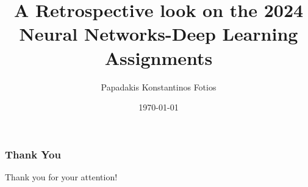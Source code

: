 \documentclass{beamer}
\title{A Retrospective look on the 2024 Neural Networks-Deep Learning Assignments}
\author{Papadakis Konstantinos Fotios}
\date{\today}
\begin{document}
\frame{\titlepage}







\begin{frame}
    \frametitle{Thank You}
    \begin{center}
        \Huge{Thank you for your attention!}
    \end{center}
\end{frame}
\end{document}
